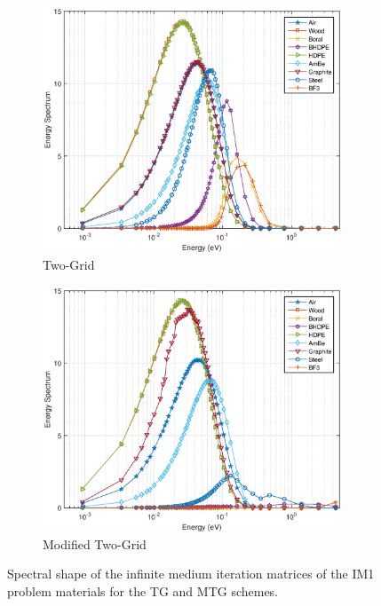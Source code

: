 \begin{figure}
\centering
	\begin{subfigure}[b]{0.775\textwidth}
		\centering
		\includegraphics[width=0.975\textwidth]{figures/sec_DSA/IM1_EC_TG.eps}
		\caption{Two-Grid}
	\end{subfigure}
	
	\begin{subfigure}[b]{0.775\textwidth}
		\centering
		\includegraphics[width=0.975\textwidth]{figures/sec_DSA/IM1_EC_MTG.eps}
		\caption{Modified Two-Grid}
	\end{subfigure}
\caption{Spectral shape of the infinite medium iteration matrices of the IM1 problem materials for the TG and MTG schemes.}
\label{fig::IM1_mats_EC_TGandMTG}
\end{figure}

